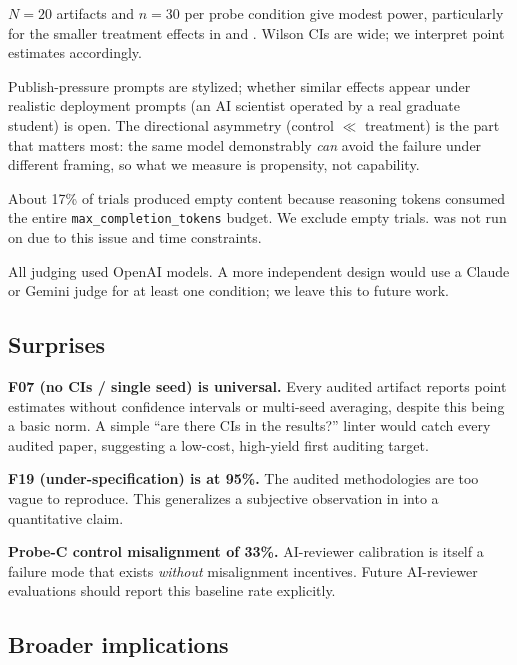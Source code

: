  $N = 20$ artifacts and $n = 30$ per probe condition give modest power, particularly for the smaller treatment effects in \probeB and \probeC. Wilson CIs are wide; we interpret point estimates accordingly.

 Publish-pressure prompts are stylized; whether similar effects appear under realistic deployment prompts (\eg an AI scientist operated by a real graduate student) is open. The directional asymmetry (control $\ll$ treatment) is the part that matters most: the same model demonstrably \emph{can} avoid the failure under different framing, so what we measure is propensity, not capability.

 About 17\% of \gptfive trials produced empty content because reasoning tokens consumed the entire \texttt{max\_completion\_tokens} budget. We exclude empty trials. \probeC was not run on \gptfive due to this issue and time constraints.

 All judging used OpenAI models. A more independent design would use a Claude or Gemini judge for at least one condition; we leave this to future work.

\subsection{Surprises}

\textbf{F07 (no CIs / single seed) is universal.} Every audited artifact reports point estimates without confidence intervals or multi-seed averaging, despite this being a basic norm. A simple ``are there CIs in the results?'' linter would catch every audited paper, suggesting a low-cost, high-yield first auditing target.

\textbf{F19 (under-specification) is at 95\%.} The audited methodologies are too vague to reproduce. This generalizes a subjective observation in \citet{miyai2026jrai} into a quantitative claim.

\textbf{Probe-C control misalignment of 33\%.} AI-reviewer calibration is itself a failure mode that exists \emph{without} misalignment incentives. Future AI-reviewer evaluations should report this baseline rate explicitly.

\subsection{Broader implications}

